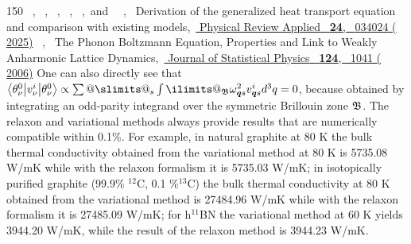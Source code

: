 \documentclass[
prb,
twocolumn,
superscriptaddress,
 amsmath,amssymb,
 aps,
longbibliography,
]{revtex4-2}
\begin{document}
\begin{thebibliography}{150}
  \BibitemOpen
   { {~},  {\ },  {~},  {~},  {~},\ and\  {~},\ } { {Derivation of the generalized heat transport equation and comparison with existing models},\ }\href {https://doi.org/10.1103/xvbk-75bf} { { {Physical Review Applied}\ }\textbf { {24}},\  {034024} ( {2025})}
  \BibitemOpen
   { {~},\ } { {The {Phonon} {Boltzmann} {Equation}, {Properties} and {Link} to {Weakly} {Anharmonic} {Lattice} {Dynamics}},\ }\href {https://doi.org/10.1007/s10955-005-8088-5} { { {Journal of Statistical Physics}\ }\textbf { {124}},\  {1041} ( {2006})}
  \BibitemOpen
   {One can also directly see that $\protect \big <\theta ^{0}_{\nu }\protect \big | v^i_\nu \protect \big |\theta ^{0}_{\nu }\protect \big >\propto \DOTSB \sum@ \slimits@ _s\DOTSI \intop \ilimits@ _{\protect \mathfrak {B}}\omega _{\protect \bm {q}s}^2 v^i_{\protect \bm {q}s} d^3q =0$, because obtained by integrating an odd-parity integrand over the symmetric Brillouin zone $\protect \mathfrak {B}$.}
  \BibitemOpen
   {The relaxon \cite {cepellotti_thermal_2016} and variational \cite {fugallo_ab_2013} methods always provide results that are numerically compatible within 0.1\%. For example, in natural graphite at 80 K the bulk thermal conductivity obtained from the variational method \cite {fugallo_ab_2013} at 80 K is 5735.08 W/mK while with the relaxon formalism it is 5735.03 W/mK; in isotopically purified graphite (99.9\% $^{12}$C, 0.1 \%$^{13}$C) the bulk thermal conductivity at 80 K obtained from the variational method is 27484.96 W/mK while with the relaxon formalism it is 27485.09 W/mK; for h$^{11}$BN the variational method at 60 K yields 3944.20 W/mK, while the result of the relaxon method is 3944.23 W/mK.}

\end{thebibliography}
\end{document}
